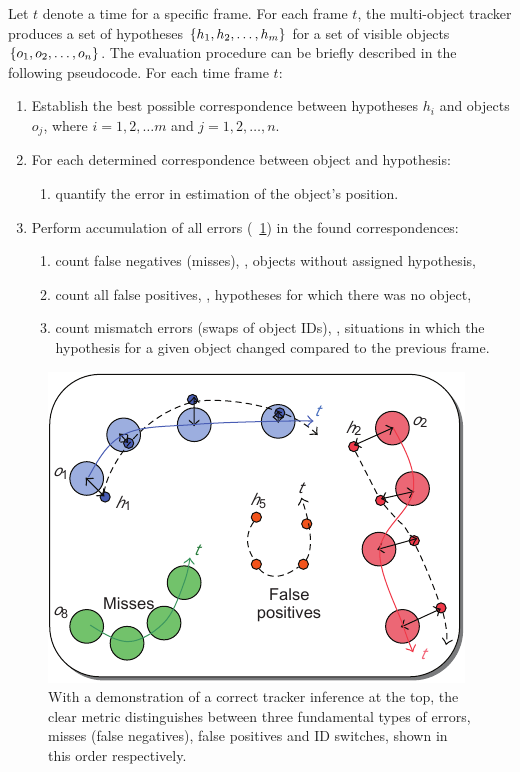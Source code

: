 Let $t$ denote a time for a specific frame. For each frame $t$, the multi-object tracker produces a set of hypotheses $\left\{ {h_1, h_2, \dots, h_m} \right\}$ for a set of visible objects $\left\{ {o_1, o_2, \dots, o_n} \right\}$. The evaluation procedure can be briefly described in the following pseudocode.
\noindent For each time frame $t$:
\begin{enumerate}
    \item Establish the best possible correspondence between hypotheses $h_i$ and objects $o_j$, where $i = 1, 2, \dots m$ and $j = 1, 2, \dots, n$.
    \item For each determined correspondence between object and hypothesis:
          \begin{enumerate}
              \item quantify the error in estimation of the object's position.
          \end{enumerate}
    \item Perform accumulation of all errors (\figtext{}~\ref{fig:CLEARHypotheses}) in the found correspondences:
          \begin{enumerate}
              \item count false negatives (misses), \ietext{}, objects without assigned hypothesis,
              \item count all false positives, \ietext{}, hypotheses for which there was no object,
              \item count mismatch errors (swaps of object IDs), \ietext{}, situations in which the hypothesis for a given object changed compared to the previous frame.
          \end{enumerate}
\end{enumerate}

\begin{figure}[t]
    \centerline{\includegraphics[width=0.55\linewidth]{figures/theoretical_foundations/clear_hypotheses_status.pdf}}
    \caption[\gls{clear} hypotheses]{With a demonstration of a correct tracker inference at the top, the \gls{clear} metric distinguishes between three fundamental types of errors, misses (false negatives), false positives and ID switches, shown in this order respectively. }
    \label{fig:CLEARHypotheses}
\end{figure}

